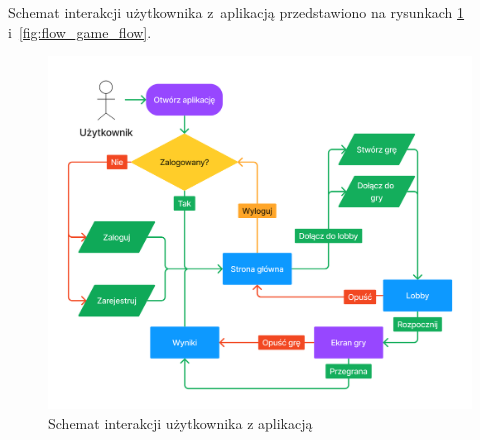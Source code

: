 Schemat interakcji użytkownika z~aplikacją przedstawiono na rysunkach
\ref{fig:flow_user_flow} i~\ref{fig:flow_game_flow}.

\begin{figure}[h]
  \centering
  \includegraphics[width=\textwidth]{img/flow-aplikacji/user_flow.png}
  \caption{Schemat interakcji użytkownika z aplikacją}
  \label{fig:flow_user_flow}
\end{figure}


